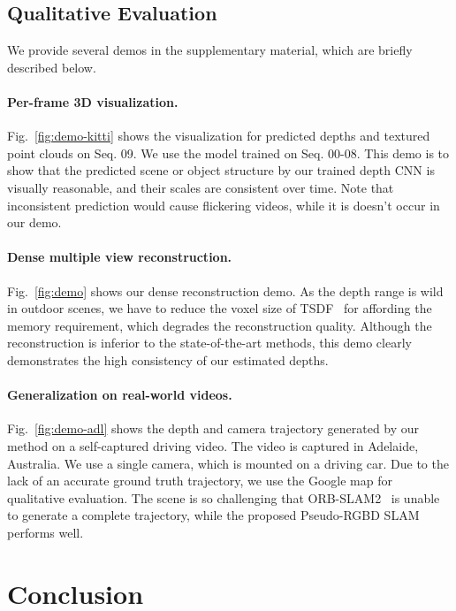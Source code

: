 \documentclass[twocolumn]{svjour3}
\renewcommand{\cite}[1]{\textcolor{blue}{\citep{#1}}}
\newcommand{\figref}[1]{Fig.~\ref{#1}}
\begin{document}
\subsection{Qualitative Evaluation}\label{sec:demo}

We provide several demos in the supplementary material,
which are briefly described below.

\paragraph{Per-frame 3D visualization.}
\figref{fig:demo-kitti} shows the visualization for predicted depths and textured point clouds on Seq. 09.
We use the model trained on Seq. 00-08.
This demo is to show that the predicted scene or object structure by our trained depth CNN is visually reasonable,
and their scales are consistent over time.
Note that inconsistent prediction would cause flickering videos,
while it is doesn't occur in our demo.



\paragraph{Dense multiple view reconstruction.}
\figref{fig:demo} shows our dense reconstruction demo.
As the depth range is wild in outdoor scenes,
we have to reduce the voxel size of TSDF~\cite{curless1996volumetric} for affording the memory requirement, which degrades the reconstruction quality.
Although the reconstruction is inferior to the state-of-the-art methods,
this demo clearly demonstrates the high consistency of our estimated depths.



\paragraph{Generalization on real-world videos.}
\figref{fig:demo-adl} shows the depth and camera trajectory generated by our method on a self-captured driving video.
The video is captured in Adelaide, Australia.
We use a single camera, which is mounted on a driving car.
Due to the lack of an accurate ground truth trajectory, we use the Google map for qualitative evaluation.
The scene is so challenging that ORB-SLAM2~\cite{murORB2} is unable to generate a complete trajectory,
while the proposed Pseudo-RGBD SLAM performs well.

 
\section{Conclusion}
\end{document}
